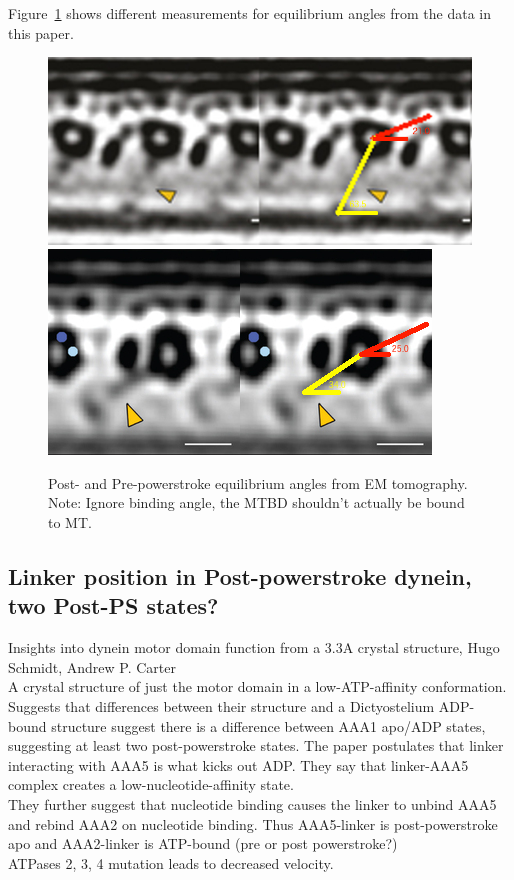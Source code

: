 \documentclass[10pt]{article} %
\begin{document}
Figure~\ref{fig:em_tomography_eq_angles} shows different measurements
for equilibrium angles from the data in this paper.
\begin{figure}[h!]
  \centering
  \includegraphics[width=.45\textwidth]{../figures/Post_powerstroke_tomography.jpg}
  \includegraphics[width=.45\textwidth]{../figures/Pre_powerstroke_tomography.jpg}
  \caption{Post- and Pre-powerstroke equilibrium angles from EM tomography. Note: Ignore binding angle, the MTBD shouldn't actually be bound to MT.}
  \label{fig:em_tomography_eq_angles}
\end{figure}

\subsection{Linker position in Post-powerstroke dynein, two Post-PS states?}
Insights into dynein motor domain function from a 3.3A crystal structure, Hugo Schmidt, Andrew P. Carter\\

A crystal structure of just the motor domain in a low-ATP-affinity conformation. Suggests that differences between their structure and a Dictyostelium ADP-bound structure suggest there is a difference between AAA1 apo/ADP states, suggesting at least two post-powerstroke states. The paper postulates that linker interacting with AAA5 is what kicks out ADP. They say that linker-AAA5 complex creates a low-nucleotide-affinity state.\\

They further suggest that nucleotide binding causes the linker to unbind AAA5 and rebind AAA2 on nucleotide binding. Thus AAA5-linker is post-powerstroke apo and AAA2-linker is ATP-bound (pre or post powerstroke?)\\

ATPases 2, 3, 4 mutation leads to decreased velocity.\\
\end{document}
